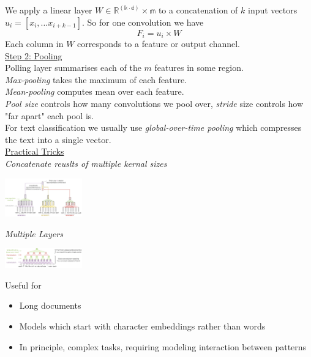 \documentclass[8pt]{extarticle} %
\begin{document}
\begin{multicols*}{3}
We apply a linear layer $W\in\mathbb{R^(k\cdot d)\times m}$ to a concatenation of $k$ input vectors $u_i=\left[x_i, \ldots x_{i+k-1}\right]$. So for one convolution we have
$$F_i = u_i \times W$$
Each column in $W$ corresponds to a feature or output channel.\\

\underline{Step 2: Pooling}\\

Polling layer summarises each of the $m$ features in some region.\\

\textit{Max-pooling} takes the maximum of each feature.\\
\textit{Mean-pooling} computes mean over each feature.\\

\textit{Pool size} controls how many convolutions we pool over, \textit{stride} size controls how "far apart" each pool is.\\

For text classification we usually use \textit{global-over-time pooling} which compresses the text into a single vector. \\

\underline{Practical Tricks}\\
\textit{Concatenate reuslts of multiple kernal sizes}
\begin{center}
\includegraphics*[width=0.25\textwidth]{media/multiple-kers.png}
\end{center}
\textit{Multiple Layers}
\begin{center}
\includegraphics*[width=0.25\textwidth]{media/multiple-layers.png}
\end{center}
Useful for
\begin{itemize}[label=\textbullet, labelsep=0.3em, leftmargin=0.5em, itemsep=0em]
    \item Long documents
    \item Models which start with character embeddings rather than words
    \item In principle, complex tasks, requiring modeling interaction
    between patterns
\end{itemize}


\end{multicols*}
\end{document}
